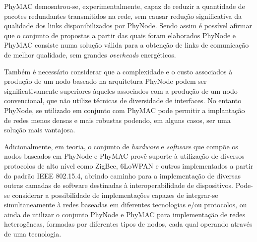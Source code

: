 \documentclass[
	12pt,				%
	openright,			%
	oneside,
	a4paper,			%
	english,			%
	french,				%
	spanish,			%
	brazil				%
	]{abntex2}
\begin{document}
PhyMAC demosntrou-se, experimentalmente, capaz de reduzir a quantidade de pacotes redundantes transmitidos na rede, sem causar redução significativa da qualidade dos links disponibilizados por PhyNode. Sendo assim é possível afirmar que o conjunto de propostas a partir das quais foram elaborados PhyNode e PhyMAC consiste numa solução válida para a obtenção de links de comunicação de melhor qualidade, sem grandes \textit{overheads} energéticos.

Também é necessário considerar que a complexidade e o custo associados à produção de um nodo baseado na arquitetura PhyNode podem ser significativamente superiores àqueles associados com a produção de um nodo convencional, que não utilize técnicas de diversidade de interfaces. No entanto PhyNode, se utilizado em conjunto com PhyMAC pode permitir a implantação de redes menos densas e mais robustas podendo, em alguns casos, ser uma solução mais vantajosa.

Adicionalmente, em teoria, o conjunto de \textit{hardware} e \textit{software} que compõe os nodos baseados em PhyNode e PhyMAC provê suporte à utilização de diversos protocolos de alto nível como ZigBee, 6LoWPAN e outros implementados a partir do padrão IEEE 802.15.4, abrindo caminho para a implementação de diversas outras camadas de software destinadas à interoperabilidade de dispositivos. Pode-se considerar a possibilidade de implementações capazes de integrar-se simultaneamente à redes baseadas em diferentes tecnologias e/ou protocolos, ou ainda de utilizar o conjunto PhyNode e PhyMAC para implementação de redes heterogêneas, formadas por diferentes tipos de nodos, cada qual operando através de uma tecnologia.

\postextual



%
%

\end{document}
